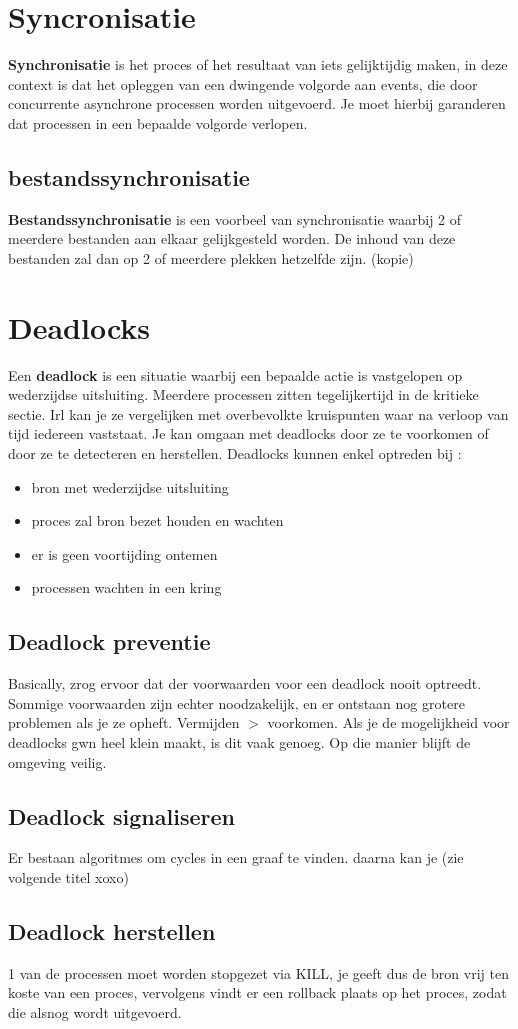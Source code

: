\documentclass{report}
\begin{document}
   		\section{Syncronisatie}
   			\textbf{Synchronisatie} is het proces of het resultaat van iets gelijktijdig maken, in deze context is dat het opleggen van een dwingende volgorde aan events, die door concurrente asynchrone processen worden uitgevoerd. Je moet hierbij garanderen dat processen in een bepaalde volgorde verlopen. 
   			\subsection{bestandssynchronisatie}
   				\textbf{Bestandssynchronisatie} is een voorbeel van synchronisatie waarbij 2 of meerdere bestanden aan elkaar gelijkgesteld worden. De inhoud van deze bestanden zal dan op 2 of meerdere plekken hetzelfde zijn. (kopie) 
   		\section{Deadlocks}
   			Een \textbf{deadlock} is een situatie waarbij een bepaalde actie is vastgelopen op wederzijdse uitsluiting. Meerdere processen zitten tegelijkertijd in de kritieke sectie. Irl kan je ze vergelijken met overbevolkte kruispunten waar na verloop van tijd iedereen vaststaat. Je kan omgaan met deadlocks door ze te voorkomen of door ze te detecteren en herstellen. Deadlocks kunnen enkel optreden bij : 
   			\begin{itemize}
   				\item bron met wederzijdse uitsluiting
   				\item proces zal bron bezet houden en wachten 
   				\item er is geen voortijding ontemen 
   				\item processen wachten in een kring
   			\end{itemize}
   			\subsection{Deadlock preventie}
   				Basically, zrog ervoor dat der voorwaarden voor een deadlock nooit optreedt. Sommige voorwaarden zijn echter noodzakelijk, en er ontstaan nog grotere problemen als je ze opheft. Vermijden \(>\) voorkomen. Als je de mogelijkheid voor deadlocks gwn heel klein maakt, is dit vaak genoeg. Op die manier blijft de omgeving veilig. 
   			\subsection{Deadlock signaliseren}
   				Er bestaan algoritmes om cycles in een graaf te vinden. daarna kan je (zie volgende titel xoxo)
   			\subsection{Deadlock herstellen}
   				1 van de processen moet worden stopgezet via KILL, je geeft dus de bron vrij ten koste van een proces, vervolgens vindt er een rollback plaats op het proces, zodat die alsnog wordt uitgevoerd. 
   			
\end{document}
